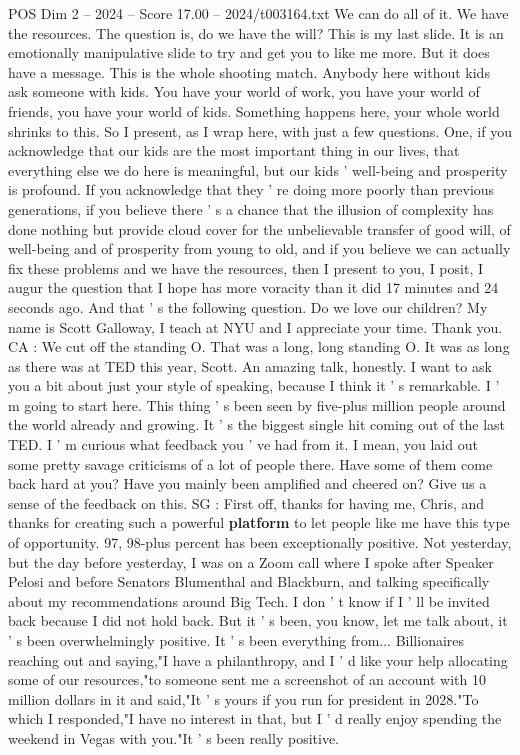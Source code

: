 \begin{textsample}{POS Dim 2 – 2024 – Score 17.00 – 2024/t003164.txt}
We can do all of it.
We have the resources.
The question is, do we have the will?
This is my last slide.
It is an emotionally manipulative slide to try and get you to like me more.
But it does have a message.
This is the whole shooting match.
Anybody here without kids ask someone with kids.
You have your world of work, you have your world of friends, you have your world of kids.
Something happens here, your whole world shrinks to this.
So I present, as I wrap here, with just a few questions.
One, if you acknowledge that our kids are the most important thing in our lives, that everything else we do here is meaningful, but our kids ' well-being and prosperity is profound.
If you acknowledge that they ' re doing more poorly than previous generations, if you believe there ' s a chance that the illusion of complexity has done nothing but provide cloud cover for the unbelievable transfer of good will, of well-being and of prosperity from young to old, and if you believe we can actually fix these problems and we have the resources, then I present to you, I posit, I augur the question that I hope has more voracity than it did 17 minutes and 24 seconds ago.
And that ' s the following question.
Do we love our children?
My name is Scott Galloway, I teach at NYU and I appreciate your time.
Thank you.
CA : We cut off the standing O.
That was a long, long standing O.
It was as long as there was at TED this year, Scott.
An amazing talk, honestly.
I want to ask you a bit about just your style of speaking, because I think it ' s remarkable.
I ' m going to start here.
This thing ' s been seen by five-plus million people around the world already and growing.
It ' s the biggest single hit coming out of the last TED.
I ' m curious what feedback you ' ve had from it.
I mean, you laid out some pretty savage criticisms of a lot of people there.
Have some of them come back hard at you?
Have you mainly been amplified and cheered on?
Give us a sense of the feedback on this.
SG : First off, thanks for having me, Chris, and thanks for creating such a powerful \textbf{platform} to let people like me have this type of opportunity. 97, 98-plus percent has been exceptionally positive.
Not yesterday, but the day before yesterday, I was on a Zoom call where I spoke after Speaker Pelosi and before Senators Blumenthal and Blackburn, and talking specifically about my recommendations around Big Tech.
I don ' t know if I ' ll be invited back because I did not hold back.
But it ' s been, you know, let me talk about, it ' s been overwhelmingly positive.
It ' s been everything from...
Billionaires reaching out and saying,"I have a philanthropy, and I ' d like your help allocating some of our resources,"to someone sent me a screenshot of an account with 10 million dollars in it and said,"It ' s yours if you run for president in 2028."To which I responded,"I have no interest in that, but I ' d really enjoy spending the weekend in Vegas with you."It ' s been really positive.

\end{textsample}
